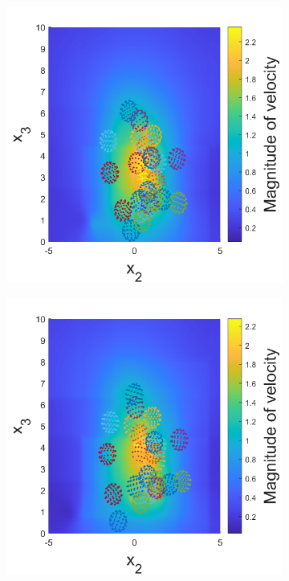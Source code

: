 \begin{figure}
\begin{subfigure}[b]{0.24\textwidth}
    \caption[]{\label{fig:squirmerB}}
\end{subfigure}
\begin{subfigure}[b]{0.24\textwidth}
    \centering
    \includegraphics[width=\textwidth]{Images/squirmers/Gyro-3.pdf}
    \caption[]{\label{fig:squirmerC}}
\end{subfigure}
\begin{subfigure}[b]{0.24\textwidth}
    \centering
    \includegraphics[width=\textwidth]{Images/squirmers/Gyro-4.pdf}

\end{subfigure}
\end{figure}
